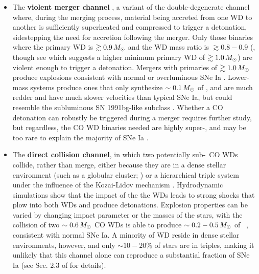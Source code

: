 \begin{itemize}

	\item The {\bf violent merger channel} \citep{pakm+10}, a variant of the double-degenerate channel where, during the merging process, material being accreted from one WD to another is sufficiently superheated and compressed to trigger a detonation, sidestepping the need for accretion following the merger.  Only those binaries where the primary WD is $\gtrsim0.9\,\Msun$ and the WD mass ratio is $\gtrsim0.8-0.9$ (\citealt{pakm+10, pakm+11, sato+16}, though see \citealt{dan+12} which suggests a higher minimum primary WD of $\gtrsim1.0\,\Msun$) are violent enough to trigger a detonation.  Mergers with primaries of $\gtrsim1.0\,\Msun$ produce explosions consistent with normal or overluminous SNe Ia \citep{pakm+12, moll+14}.  Lower-mass systems produce ones that only synthesize $\sim0.1\,\Msun$ of \Ni, and are much redder and have much slower velocities than typical SNe Ia, but could resemble the subluminous SN 1991bg-like subclass \citep{lieb+93, pakm+10}.  Whether a CO detonation can robustly be triggered during a merger requires further study, but regardless, the CO WD binaries needed are highly super-\Mch, and may be too rare to explain the majority of SNe Ia \citep{badem12}.

	\item The {\bf direct collision channel}, in which two potentially sub-\Mch\ CO WDs collide, rather than merge, either because they are in a dense stellar environment (such as a globular cluster; \citealt{benzth89, loreig10}) or a hierarchical triple system \citep{katzd12} under the influence of the Kozai-Lidov mechanism \citep{koza62, lido62}.  Hydrodynamic simulations \citep{kush+13, garc+13, dong+15} show that the impact of the the WDs leads to strong shocks that plow into both WDs and produce detonations.  Explosion properties can be varied by changing impact parameter or the masses of the stars, with the collision of two $\sim0.6\,\Msun$ CO WDs is able to produce $\sim0.2-0.5\,\Msun$ of \Ni\ \citep{garc+13, kush+13}, consistent with normal SNe Ia.  A minority of WD reside in dense stellar environments, however, and only $\sim10-20$\% of stars are in triples, making it unlikely that this channel alone can reproduce a substantial fraction of SNe Ia (see Sec. 2.3 of \citealt{maozmn14} for details).


\end{itemize}
